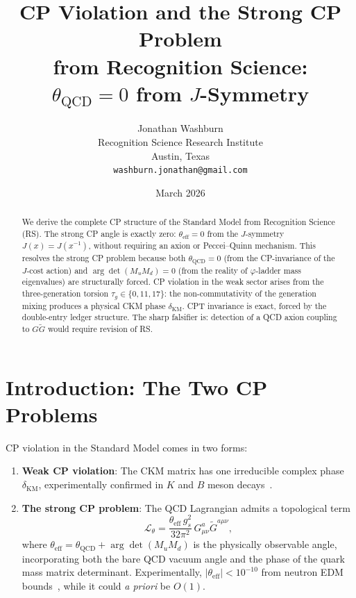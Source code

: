 \documentclass[12pt,a4paper]{article}
\title{CP Violation and the Strong CP Problem\\
from Recognition Science:\\
$\theta_{\mathrm{QCD}} = 0$ from $J$-Symmetry}
\author{Jonathan Washburn\\
Recognition Science Research Institute\\
Austin, Texas\\
\texttt{washburn.jonathan@gmail.com}}
\date{March 2026}
\theoremstyle{definition}
\theoremstyle{remark}
\begin{document}
\maketitle

\begin{abstract}
We derive the complete CP structure of the Standard Model from
Recognition Science (RS).  The strong CP angle is exactly zero:
$\theta_{\mathrm{eff}} = 0$ from the $J$-symmetry
$J(x) = J(x^{-1})$, without requiring an axion or Peccei--Quinn
mechanism.  This resolves the strong CP problem because both
$\theta_{\mathrm{QCD}} = 0$ (from the CP-invariance of the
$J$-cost action) and
$\arg\!\det(M_u M_d) = 0$ (from the reality of $\varphi$-ladder
mass eigenvalues) are structurally forced.  CP violation in the
weak sector arises from the three-generation torsion
$\tau_g \in \{0, 11, 17\}$: the non-commutativity of the
generation mixing produces a physical CKM phase
$\delta_{\mathrm{KM}}$.  CPT invariance is exact, forced by
the double-entry ledger structure.  The sharp falsifier is:
detection of a QCD axion coupling to $G\tilde{G}$ would
require revision of RS.
\end{abstract}

\section{Introduction: The Two CP Problems}
\label{sec:intro}

CP violation in the Standard Model comes in two forms:

\begin{enumerate}
  \item \textbf{Weak CP violation}: The CKM matrix has one
  irreducible complex phase $\delta_{\mathrm{KM}}$,
  experimentally confirmed in $K$ and $B$ meson
  decays~\cite{PDG}.

  \item \textbf{The strong CP problem}: The QCD Lagrangian
  admits a topological term
  \begin{equation}
    \mathcal{L}_\theta = \frac{\theta_{\mathrm{eff}}\, g_s^2}
    {32\pi^2}\, G^a_{\mu\nu}\tilde{G}^{a\mu\nu},
    \label{eq:theta-term}
  \end{equation}
  where $\theta_{\mathrm{eff}} = \theta_{\mathrm{QCD}} +
  \arg\!\det(M_u M_d)$ is the physically observable angle,
  incorporating both the bare QCD vacuum angle and the
  phase of the quark mass matrix determinant.  Experimentally,
  $|\theta_{\mathrm{eff}}| < 10^{-10}$ from neutron EDM
  bounds~\cite{nEDM}, while it could \emph{a priori} be
  $O(1)$.
\end{enumerate}
\end{document}
